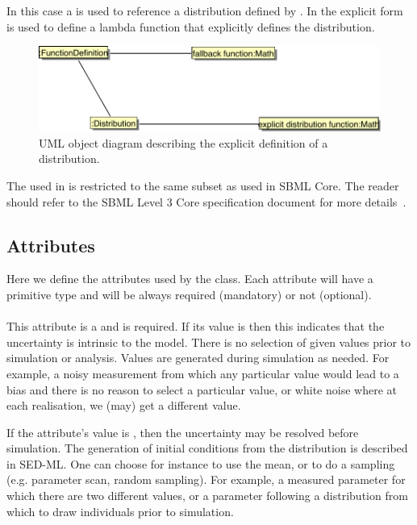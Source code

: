 \documentclass[draftspec]{sbmlpkgspec}
\begin{document}
In this case a \unidistrib is used to reference a distribution defined
by \uncertml. In the explicit form \mathml is used to define a lambda
function that explicitly defines the distribution.
 

\begin{figure}[htb]
\includegraphics[width=0.7\linewidth]{explicitDistrib.pdf}
\caption{UML object diagram describing the explicit definition of a distribution.}
\label{fig:umlexplicitdistrib}
\end{figure}
 
 The \mathml used in \mlambda is restricted to the same subset as used
in SBML Core. The reader should refer to the SBML Level 3 Core
specification document for more details~\cite{l3v1c}.

\subsection{Attributes}

Here we define the attributes used by the \Distribution class. Each
attribute will have a primitive type and will be always required
(mandatory) or not (optional).

\paragraph{}

This attribute is a  and is required. If its value is 
then this indicates that the uncertainty is intrinsic to the
model. There is no selection of given values prior to simulation or
analysis. Values are generated during simulation as needed. For
example, a noisy measurement from which any particular value would
lead to a bias and there is no reason to select a particular value,
or white noise where at each realisation, we (may) get a different value.

If the attribute's value is , then the uncertainty may be
resolved before simulation. The generation of initial conditions from
the distribution is described in SED-ML. One can choose for instance
to use the mean, or to do a sampling (e.g. parameter scan, random
sampling). For example, a measured parameter for which there are two
different values, or a parameter following a distribution from which
to draw individuals prior to simulation.
\end{document}
